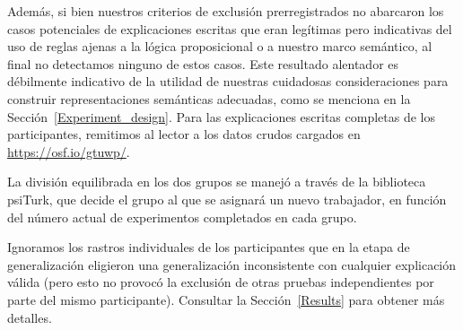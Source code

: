 Además, si bien nuestros criterios de exclusión prerregistrados no abarcaron los casos potenciales de explicaciones escritas que eran legítimas pero indicativas del uso de reglas ajenas a la lógica proposicional o a nuestro marco semántico, al final no detectamos ninguno de estos casos. Este resultado alentador es débilmente indicativo de la utilidad de nuestras cuidadosas consideraciones para construir representaciones semánticas adecuadas, como se menciona en la Sección~\ref{Experiment_design}. Para las explicaciones escritas completas de los participantes, remitimos al lector a los datos crudos cargados en \url{https://osf.io/gtuwp/}.

La división equilibrada en los dos grupos se manejó a través de la biblioteca psiTurk, que decide el grupo al que se asignará un nuevo trabajador, en función del número actual de experimentos completados en cada grupo.

Ignoramos los rastros individuales de los participantes que en la etapa de generalización eligieron una generalización inconsistente con cualquier explicación válida (pero esto no provocó la exclusión de otras pruebas independientes por parte del mismo participante). Consultar la Sección~\ref{Results} para obtener más detalles.

